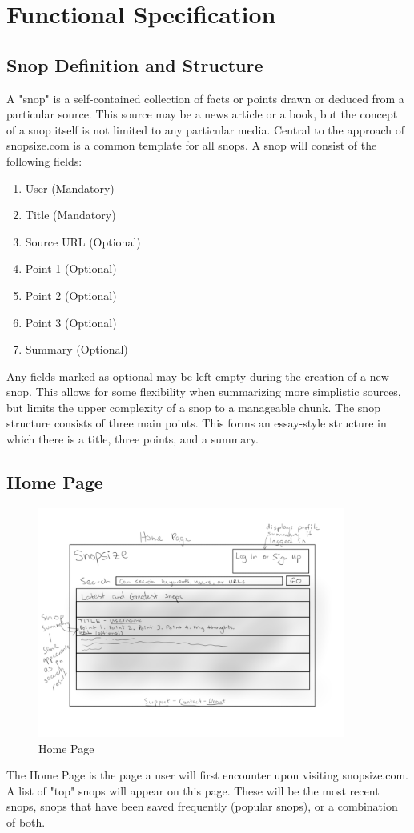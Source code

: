 \documentclass[11pt]{article}
\begin{document}
\section{Functional Specification}
\label{sec:functional_spec}
\subsection{Snop Definition and Structure}
\label{sec:snop_structure}
A "snop" is a self-contained collection of facts or points drawn or deduced from a particular source. This source may be a news article or a book, but the concept of a snop itself is not limited to any particular media. Central to the approach of snopsize.com is a common template for all snops. A snop will consist of the following fields:
\begin{enumerate}
\item User (Mandatory)
\item Title (Mandatory)
\item Source URL (Optional)
\item Point 1 (Optional)
\item Point 2 (Optional)
\item Point 3 (Optional)
\item Summary (Optional)
\end{enumerate}
Any fields marked as optional may be left empty during the creation of a new snop. This allows for some flexibility when summarizing more simplistic sources, but limits the upper complexity of a snop to a manageable chunk. The snop structure consists of three main points. This forms an essay-style structure in which there is a title, three points, and a summary.
\subsection{Home Page}
\begin{figure}[htb]
\begin{center}
\includegraphics[width=0.9\textwidth]{home_page.png}
\caption{Home Page}
\label{fig:fig_home_page}
\end{center}
\end{figure}
The Home Page is the page a user will first encounter upon visiting snopsize.com. A list of "top" snops will appear on this page. These will be the most recent snops, snops that have been saved frequently (popular snops), or a combination of both.
\end{document}
